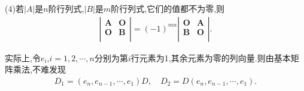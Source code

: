 \documentclass[../../main.tex]{subfiles}
\begin{document}
\begin{proposition}
(4)若\(\vert A\vert\)是\(n\)阶行列式,\(\vert B\vert\)是\(m\)阶行列式,它们的值都不为零,则
\begin{align*}
\left| \left. \begin{matrix}
\boldsymbol{A}&		\boldsymbol{O}\\
\boldsymbol{O}&		\boldsymbol{B}\\
\end{matrix} \right. \right|=\left( -1 \right) ^{mn}\left. \left| \begin{matrix}
\boldsymbol{O}&		\boldsymbol{A}\\
\boldsymbol{B}&		\boldsymbol{O}\\
\end{matrix} \right| \right. .
\end{align*}
\end{proposition}
\begin{remark}
实际上,令$e_i$,$i=1,2,\cdots,n$分别为第$i$行元素为1,其余元素为零的列向量.则由基本矩阵乘法,不难发现
\begin{align*}
D_1=\left( e_n,e_{n-1},\cdots ,e_1 \right) D,\quad D_2=D\left( e_n,e_{n-1},\cdots ,e_1 \right) .
\end{align*}
\end{remark}
\end{document}
